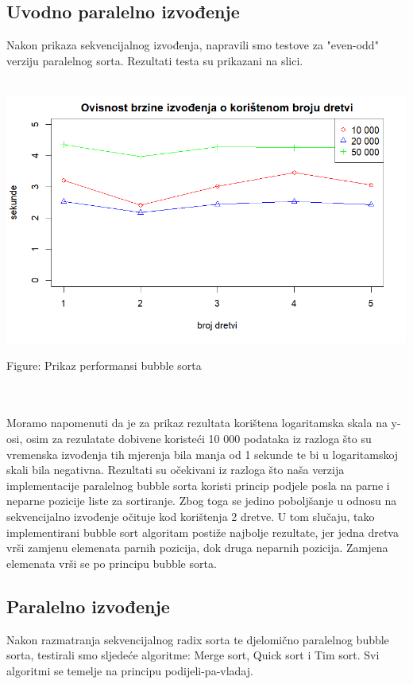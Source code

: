 \documentclass[conference]{IEEEtran}
\begin{document}
\subsection{Uvodno paralelno izvođenje}
Nakon prikaza sekvencijalnog izvođenja, napravili smo testove za "even-odd" verziju paralelnog sorta.
Rezultati testa su prikazani na slici.\\
\\
\noindent
\begin{minipage}{\linewidth}
\centering
\includegraphics[width=1\linewidth]{bubblePerf.png}
\caption{Figure: Prikaz performansi bubble sorta}
\label{bubble - performance}
\end{minipage}
\\
\\


Moramo napomenuti da je za prikaz rezultata korištena logaritamska skala na y-osi, osim za rezulatate dobivene koristeći 10 000 podataka iz razloga što su vremenska izvođenja tih mjerenja bila manja od 1 sekunde te bi u logaritamskoj skali bila negativna. Rezultati su očekivani iz razloga što naša verzija implementacije paralelnog bubble sorta koristi princip podjele posla na parne i neparne pozicije liste za sortiranje. Zbog toga se jedino poboljšanje u odnosu na sekvencijalno izvođenje očituje kod korištenja 2 dretve. U tom slučaju, tako implementirani bubble sort algoritam postiže najbolje rezultate, jer jedna dretva vrši zamjenu elemenata parnih pozicija, dok druga neparnih pozicija. Zamjena elemenata vrši se po principu bubble sorta.

\subsection{Paralelno izvođenje}
Nakon razmatranja sekvencijalnog radix sorta te djelomično paralelnog bubble sorta, testirali smo sljedeće algoritme: Merge sort, Quick sort i Tim sort. Svi algoritmi se temelje na principu podijeli-pa-vladaj.
\\
\end{document}
